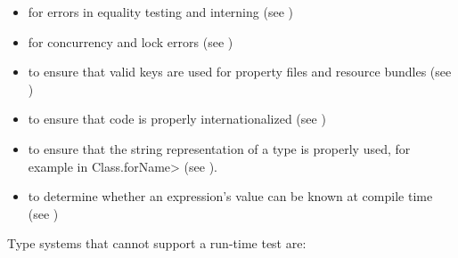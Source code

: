 \begin{itemize}
\item
   for errors in equality
  testing and interning (see )
\item
   for concurrency and lock errors
  (see )
%
\item
   to ensure that valid
  keys are used for property files and resource bundles (see
  )
\item
   to
  ensure that code is properly internationalized (see
  )
\item
   to ensure that the
  string representation of a type is properly used, for example in
  \<Class.forName> (see ).
\item
   to determine
  whether an expression's value can be known at compile time
  (see )
\end{itemize}


Type systems that cannot support a run-time test are:

